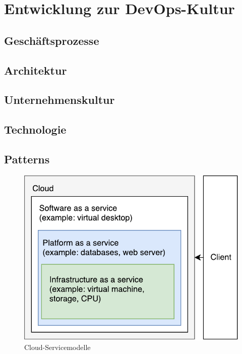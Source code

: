 \section{Entwicklung zur DevOps-Kultur} \label{entwicklung}


\subsection{Geschäftsprozesse}

\subsection{Architektur}

\subsection{Unternehmenskultur}

\subsection{Technologie}

\subsection{Patterns}

\begin{figure}[h!]
	\centering
	\includegraphics[width=0.8\linewidth]{images/servicemodules.pdf}
	\caption{Cloud-Servicemodelle} %
	\label{fig:cnn_structure}
\end{figure}